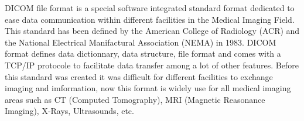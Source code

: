 DICOM file format is a special software integrated standard format dedicated to ease data communication within different facilities in the Medical Imaging Field. This standard has been defined by the American College of Radiology (ACR) and the National Electrical Manifactural Association (NEMA) in 1983. DICOM format defines data dictionnary, data structure, file format and comes with a TCP/IP protocole to facilitate data transfer among a lot of other features. Before this standard was created it was difficult for different facilities to exchange imaging and imformation, now this format is widely use for all medical imaging areas such as CT (Computed Tomography), MRI (Magnetic Reasonance Imaging), X-Rays, Ultrasounds, etc.
